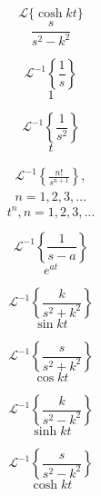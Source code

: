 \documentclass[grid, poker_landscape]{flashcards}
\begin{document}
  \begin{flashcard}{ \[ \mathcal{L} \{ \cosh kt \} \] }
    \[
      \frac{ s }{ s^2 - k^2 }
    \]
  \end{flashcard}



  \begin{flashcard}{ \[ \mathcal{L}^{-1} \left \{ \frac{1}{s} \right \} \] }
    \[
      1
    \]
  \end{flashcard}

  \begin{flashcard}{ \[ \mathcal{L}^{-1} \left \{ \frac{1}{s^2} \right \} \] }
    \[
      t
    \]
  \end{flashcard}

  \begin{flashcard}{ \[ \begin{gathered} \mathcal{L}^{-1} 
    \left \{ \frac{ n! }{ s^{n + 1} } \right \}, \\ n=1,2,3,\ldots 
    \end{gathered} \] }
    \[
      t^n, n=1,2,3,\ldots
    \]
  \end{flashcard}

  \begin{flashcard}{ \[ \mathcal{L}^{-1} 
    \left \{ \frac{ 1 }{ s - a } \right \} \] }
    \[
      e^{at}
    \]
  \end{flashcard}

  \begin{flashcard}{ \[ \mathcal{L}^{-1} 
    \left \{ \frac{ k }{ s^2 + k^2 } \right \}  \] }
    \[
      \sin kt
    \]
  \end{flashcard}

  \begin{flashcard}{\[ \mathcal{L}^{-1} 
    \left \{ \frac{ s }{ s^2 + k^2 } \right \} \] }
    \[
      \cos kt
    \]
  \end{flashcard}

  \begin{flashcard}{ \[ \mathcal{L}^{-1} 
    \left \{ \frac{ k }{ s^2 - k^2 } \right \}  \] }
    \[
      \sinh kt
    \]
  \end{flashcard}

  \begin{flashcard}{ \[ \mathcal{L}^{-1} 
    \left \{ \frac{ s }{ s^2 - k^2 } \right \} \] }
    \[
      \cosh kt
    \]
  \end{flashcard}


\end{document}
